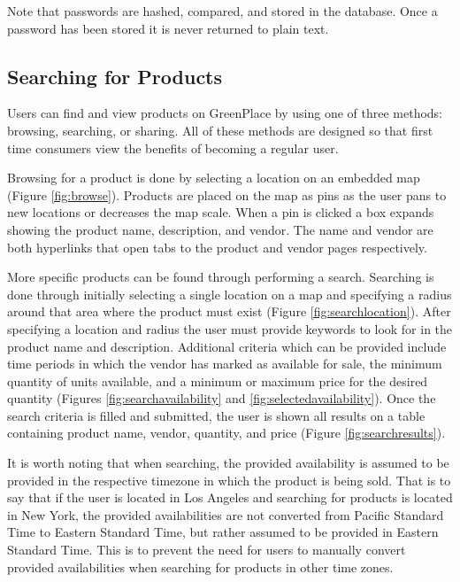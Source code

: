 \documentclass[letterpaper, 10 pt, conference]{ieeeconf}  %
\begin{document}
Note that passwords are hashed, compared, and stored in the database. Once a password has been stored it is never returned to plain text.

\subsection{Searching for Products}

Users can find and view products on GreenPlace by using one of three methods: browsing, searching, or sharing. All of these methods are designed so that first time consumers view the benefits of becoming a regular user.

Browsing for a product is done by selecting a location on an embedded map (Figure \ref{fig:browse}). Products are placed on the map as pins as the user pans to new locations or decreases the map scale. When a pin is clicked a box expands showing the product name, description, and vendor. The name and vendor are both hyperlinks that open tabs to the product and vendor pages respectively.

More specific products can be found through performing a search. Searching is done through initially selecting a single location on a map and specifying a radius around that area where the product must exist (Figure \ref{fig:searchlocation}). After specifying a location and radius the user must provide keywords to look for in the product name and description. Additional criteria which can be provided include time periods in which the vendor has marked as available for sale, the minimum quantity of units available, and a minimum or maximum price for the desired quantity (Figures \ref{fig:searchavailability} and \ref{fig:selectedavailability}). Once the search criteria is filled and submitted, the user is shown all results on a table containing product name, vendor, quantity, and price (Figure \ref{fig:searchresults}).

It is worth noting that when searching, the provided availability is assumed to be provided in the respective timezone in which the product is being sold. That is to say that if the user is located in Los Angeles and searching for products is located in New York, the provided availabilities are not converted from Pacific Standard Time to Eastern Standard Time, but rather assumed to be provided in Eastern Standard Time. This is to prevent the need for users to manually convert provided availabilities when searching for products in other time zones. 
\end{document}
